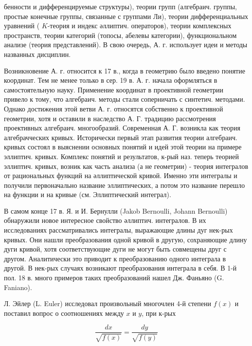 \documentclass[10pt]{article}
\begin{document}
бенности и дифференцируемые структуры), теории групп (алгебраич. группы, простые конечные группы, связанные с группами Ли), теории дифференциальных уравнений ( $K$-теория и индекс әллиптич. операторов), теории комплексных пространств, теории категорий (топосы, абелевы категории), функциональном анализе (теория представлений). В свою очередь, А. г. использует идеи и методы названных дисциплин.



Возникновение А. г. относится к 17 в., когда в геометрию было введено понятие координат. Тем не менее только в сер. 19 в. А. г. начала оформляться в самостоятельную науку. Применение координат в проективной геометрии привело к тому, что алгебраич. методы стали соперничать с синтетич. методами. Однако достижения этой ветви А. г. относятся собственно к проективной геометрии, хотя и оставили в наследство А. Г. традицию рассмотрения проективных алгебраич. многообразий. Современная А. Г. возникла как теория алгебрачческих кривых. Исторически первый этап развития теории алгебраич. кривых состоял в выяснении основных понятий и идей этой теории на примере эллиптич. кривых. Комплекс понятий и результатов, к-рый наз. теперь теорией эллиптич. кривых, возник как часть анализа (а не геометрии) - теория интегралов от рациональных функций на әллиптической кривой. Именно эти интегралы и получили первоначально название эллиптических, а потом это название перешло на функции и на кривые (см. Эллиптический интеграл).



В самом конце 17 в. Я. и И. Бернулли (Jakob Bernoulli, Johann Bernoulli) обнаружили новое интересное свойство әллиптич. интегралов. В их исследованиях рассматривались интегралы, выражающие длины дуг нек-рых кривых. Они нашли преобразования одной кривой в другую, сохраняющие длину дуги кривой, хотя соответствующие дуги не могут быть совмещены друг с другом. Аналитически это приводит к преобразованию одного интеграла в другой. В нек-рых случаях возникают преобразования интеграла в себя. В 1-й пол. 18 в. много примеров таких преобразований нашел Дж. Фаньяно (G. Faniano).



Л. Эйлер (L. Euler) исследовал произвольный многочлен 4-й степени $f(x)$ и поставил вопрос о соотношениях между $x$ и $y$, при к-рых



\[

\frac{d x}{\sqrt{f(x)}}=\frac{d y}{\sqrt{f(y)}}

\]
\end{document}

